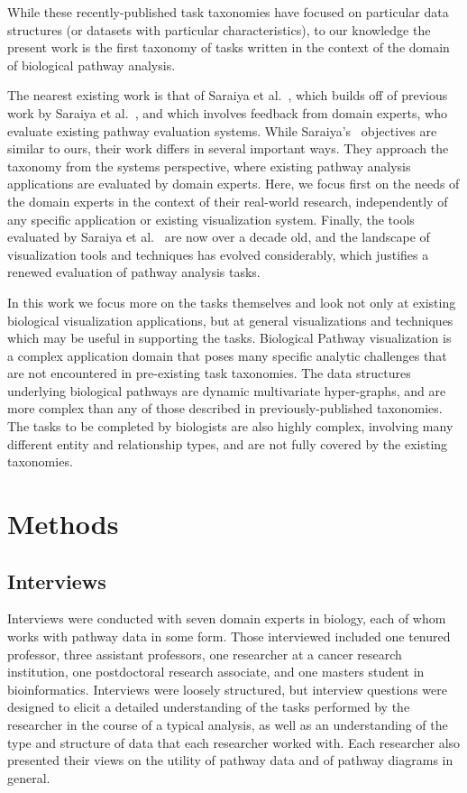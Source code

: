 \documentclass[twocolumn]{bmcart}%
\begin{document}
While these recently-published task taxonomies have focused on particular data structures (or datasets with particular characteristics), to our knowledge the present work is the first taxonomy of tasks written in the context of the domain of biological pathway analysis.

The nearest existing work is that of Saraiya et al.~\cite{saraiya2005visualizing}, which builds off of previous work by Saraiya et al.~\cite{saraiya2005insight}, and which involves feedback from domain experts, who evaluate existing pathway evaluation systems.
While Saraiya's~\cite{saraiya2005visualizing} objectives are similar to ours,
their work differs in several important ways.
They approach the taxonomy from the systems perspective, where existing pathway analysis applications are evaluated by domain experts.
Here, we focus first on the needs of the domain experts in the context of their real-world research, independently of any specific application or existing visualization system.
Finally, the tools evaluated by Saraiya et al.~\cite{saraiya2005visualizing} are now over a decade old, and the landscape of visualization tools and techniques has evolved considerably, which justifies a renewed evaluation of pathway analysis tasks.


In this work we focus more on the tasks themselves and look not only at existing biological visualization applications, but at general visualizations and techniques which may be useful in supporting the tasks.
Biological Pathway visualization is a complex application domain that poses many specific analytic challenges that are not encountered in pre-existing task taxonomies.
The data structures underlying biological pathways are dynamic multivariate hyper-graphs, and are more complex than any of those described in previously-published taxonomies.
The tasks to be completed by biologists are also highly complex, involving many different entity and relationship types, and are not fully covered by the existing taxonomies.

\section*{Methods}

\subsection*{Interviews}

Interviews were conducted with seven domain experts in biology, each of whom works with pathway data in some form.
Those interviewed included one tenured professor, three assistant professors, one researcher at a cancer research institution, one postdoctoral research associate, and one masters student in bioinformatics.
Interviews were loosely structured, but interview questions were designed to elicit a detailed understanding of the tasks performed by the researcher in the course of a typical analysis, as well as an understanding of the type and structure of data that each researcher worked with.
Each researcher also presented their views on the utility of pathway data and of pathway diagrams in general.
\end{document}
